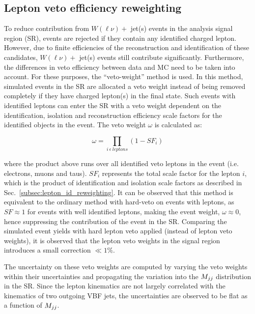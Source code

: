 \clearpage

\subsection{Lepton veto efficiency reweighting}

To reduce contribution from $W(\ell \nu)+$ jet(s) events in the analysis signal region (SR), 
events are rejected if they contain any
identified charged lepton. However, due to finite efficiencies of the
reconstruction and identification of these candidates, $W(\ell \nu)+$ jet(s)
events still contribute significantly. Furthermore, the differences in veto efficiency between data and MC
need to be taken into account. For these purposes, the ``veto-weight'' method is used.
In this method, simulated events in the SR are allocated a veto weight instead of
being removed completely if they have charged lepton(s) in the final state. Such events with
identified leptons can enter the SR with a veto weight dependent on the identification, isolation and reconstruction 
efficiency scale factors for the identified objects
in the event. The veto weight $\omega$ is calculated as:

\begin{equation}
    \omega = \prod_{i \ \epsilon \ leptons} (1-SF_{i}) 
\end{equation}

where the product above runs over all identified veto leptons in the event (i.e. electrons, muons and taus).
$SF_{i}$ represents the total scale factor for the lepton $i$, which is the product of identification and isolation
scale factors as described in Sec.~\ref{subsec:lepton_id_reweighting}. It can be observed that this method is equivalent
to the ordinary method with hard-veto on events with leptons, as $SF \approx 1$ for events with well identified leptons,
making the event weight, $\omega \approx 0$, hence suppressing the contribution of the event in the SR.
Comparing the simulated event yields with hard
lepton veto applied (instead of lepton veto weights), it is observed that the lepton veto weights in the signal region
introduces a small correction $\ll 1\%$.

The uncertainty on these veto weights are computed by varying the veto weights within their uncertainties and
propagating the variation into the $M_{jj}$ distribution in the SR. Since the lepton kinematics are not largely
correlated with the kinematics of two outgoing VBF jets, the uncertainties are observed to be flat as a function
of $M_{jj}$.

